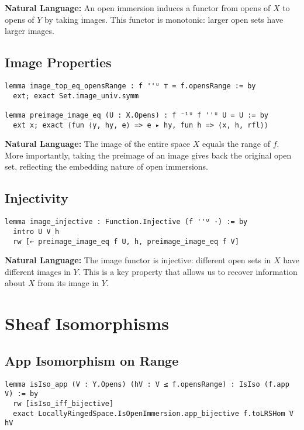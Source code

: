 \documentclass{article}
\theoremstyle{definition}
\begin{document}
\textbf{Natural Language:} An open immersion induces a functor from opens of $X$ to opens of $Y$ by taking images. This functor is monotonic: larger open sets have larger images.

\subsection{Image Properties}

\begin{lstlisting}
lemma image_top_eq_opensRange : f ''ᵁ ⊤ = f.opensRange := by
  ext; exact Set.image_univ.symm

lemma preimage_image_eq (U : X.Opens) : f ⁻¹ᵁ f ''ᵁ U = U := by
  ext x; exact ⟨fun ⟨y, hy, e⟩ => e ▸ hy, fun h => ⟨x, h, rfl⟩⟩
\end{lstlisting}

\textbf{Natural Language:} The image of the entire space $X$ equals the range of $f$. More importantly, taking the preimage of an image gives back the original open set, reflecting the embedding nature of open immersions.

\subsection{Injectivity}

\begin{lstlisting}
lemma image_injective : Function.Injective (f ''ᵁ ·) := by
  intro U V h
  rw [← preimage_image_eq f U, h, preimage_image_eq f V]
\end{lstlisting}

\textbf{Natural Language:} The image functor is injective: different open sets in $X$ have different images in $Y$. This is a key property that allows us to recover information about $X$ from its image in $Y$.

\section{Sheaf Isomorphisms}

\subsection{App Isomorphism on Range}

\begin{lstlisting}
lemma isIso_app (V : Y.Opens) (hV : V ≤ f.opensRange) : IsIso (f.app V) := by
  rw [isIso_iff_bijective]
  exact LocallyRingedSpace.IsOpenImmersion.app_bijective f.toLRSHom V hV
\end{lstlisting}
\end{document}
